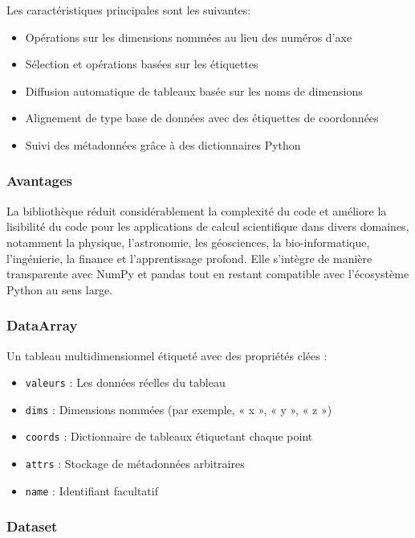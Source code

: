\documentclass[
  11pt,
  letterpaper,
  open=any,
  twoside=false,
  french]{scrbook}
\begin{document}
Les caractéristiques principales sont les suivantes:

\begin{itemize}
\item
  Opérations sur les dimensions nommées au lieu des numéros d'axe
\item
  Sélection et opérations basées sur les étiquettes
\item
  Diffusion automatique de tableaux basée sur les noms de dimensions
\item
  Alignement de type base de données avec des étiquettes de coordonnées
\item
  Suivi des métadonnées grâce à des dictionnaires Python
\end{itemize}

\subsubsection{Avantages}\label{avantages}

La bibliothèque réduit considérablement la complexité du code et
améliore la lisibilité du code pour les applications de calcul
scientifique dans divers domaines, notamment la physique, l'astronomie,
les géosciences, la bio-informatique, l'ingénierie, la finance et
l'apprentissage profond. Elle s'intègre de manière transparente avec
NumPy et pandas tout en restant compatible avec l'écosystème Python au
sens large.

\subsubsection{DataArray}\label{dataarray}

Un tableau multidimensionnel étiqueté avec des propriétés clées :

\begin{itemize}
\item
  \texttt{valeurs} : Les données réelles du tableau
\item
  \texttt{dims} : Dimensions nommées (par exemple, « x », « y », « z »)
\item
  \texttt{coords} : Dictionnaire de tableaux étiquetant chaque point
\item
  \texttt{attrs} : Stockage de métadonnées arbitraires
\item
  \texttt{name} : Identifiant facultatif
\end{itemize}

\subsubsection{Dataset}\label{dataset}
\end{document}
